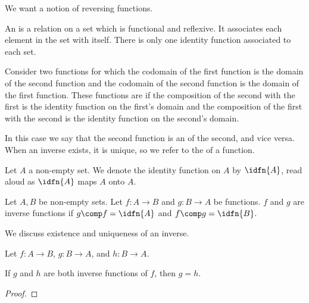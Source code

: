 
\sbasic















\sstart
{}


We want a notion of reversing functions.


An
is
a relation on a set
which is functional and
reflexive.
It associates
each element in the
set with itself.
There is only one
identity function
associated to each set.

Consider
two functions
for which the codomain
of the first function
is the domain of the
second function and
the codomain of the second
function is the domain
of the first function.
These functions are
if the composition of the
second with the first
is the identity
function
on the first's domain
and the composition of
the first with the second
is the identity
function on the
second's domain.

In this case we say
that the second function
is an
of the second, and vice versa.
When an inverse exists,
it is unique, so we refer to
the 
of a function.


Let $A$ a non-empty set.
We denote the identity
function on $A$ by $\idfn{A}$,
read aloud as
$\idfn{A}$ maps $A$ onto $A$.

Let $A, B$ be non-empty sets.
Let $f: A \to B$ and $g: B \to A$
be functions.
$f$ and $g$ are inverse functions
if $g \comp f = \idfn{A}$
and $f \comp g = \idfn{B}$.


We discuss existence and
uniqueness of an inverse.

\begin{prop}
  Let $f: A \to B$,
  $g: B \to A$,
  and $h: B \to A$.

  If $g$ and $h$
  are both inverse
  functions of $f$,
  then $g = h$.

  \begin{proof}
  \end{proof}
\end{prop}

